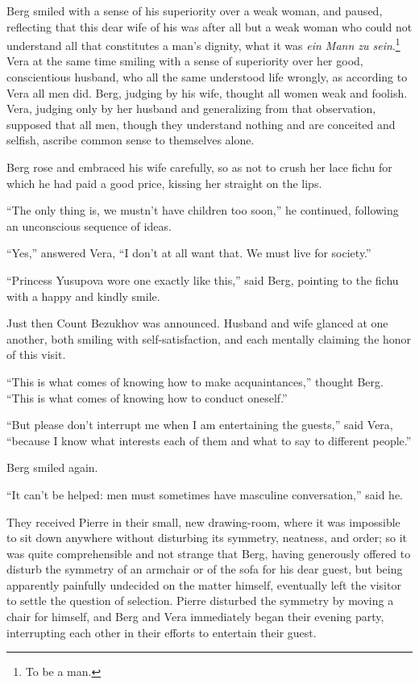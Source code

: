 Berg smiled with a sense of his superiority over a weak woman,
and paused, reflecting that this dear wife of his was after all
but a weak woman who could not understand all that constitutes a
man's dignity, what it was \emph{ein Mann zu sein}.\footnote{To
be a man.} Vera at the same time smiling with a sense of
superiority over her good, conscientious husband, who all the
same understood life wrongly, as according to Vera all men
did. Berg, judging by his wife, thought all women weak and
foolish. Vera, judging only by her husband and generalizing from
that observation, supposed that all men, though they understand
nothing and are conceited and selfish, ascribe common sense to
themselves alone.

Berg rose and embraced his wife carefully, so as not to crush her
lace fichu for which he had paid a good price, kissing her
straight on the lips.

``The only thing is, we mustn't have children too soon,'' he
continued, following an unconscious sequence of ideas.

``Yes,'' answered Vera, ``I don't at all want that. We must live
for society.''

``Princess Yusupova wore one exactly like this,'' said Berg,
pointing to the fichu with a happy and kindly smile.

Just then Count Bezukhov was announced. Husband and wife glanced
at one another, both smiling with self-satisfaction, and each
mentally claiming the honor of this visit.

``This is what comes of knowing how to make acquaintances,''
thought Berg.  ``This is what comes of knowing how to conduct
oneself.''

``But please don't interrupt me when I am entertaining the
guests,'' said Vera, ``because I know what interests each of them
and what to say to different people.''

Berg smiled again.

``It can't be helped: men must sometimes have masculine
conversation,'' said he.

They received Pierre in their small, new drawing-room, where it
was impossible to sit down anywhere without disturbing its
symmetry, neatness, and order; so it was quite comprehensible and
not strange that Berg, having generously offered to disturb the
symmetry of an armchair or of the sofa for his dear guest, but
being apparently painfully undecided on the matter himself,
eventually left the visitor to settle the question of
selection. Pierre disturbed the symmetry by moving a chair for
himself, and Berg and Vera immediately began their evening party,
interrupting each other in their efforts to entertain their
guest.

